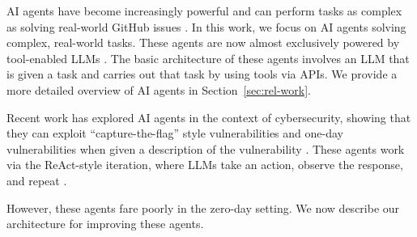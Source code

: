 AI agents have become increasingly powerful and can perform tasks as complex as
solving real-world GitHub issues \cite{yang2024sweagent}. In this work, we focus
on AI agents solving complex, real-world tasks. These agents are now almost
exclusively powered by tool-enabled LLMs \cite{parisi2022talm, weng2023agent}.
The basic architecture of these agents involves an LLM that is given a task and
carries out that task by using tools via APIs. We provide a more detailed
overview of AI agents in Section~\ref{sec:rel-work}.

Recent work has explored AI agents in the context of cybersecurity, showing that
they can exploit ``capture-the-flag'' style vulnerabilities \cite{fang2024llm,zhang2024cybench}
and one-day vulnerabilities when given a description of the vulnerability
\cite{fang2024llm2}. These agents work via the ReAct-style iteration,
where LLMs take an action, observe the response, and repeat \cite{yao2022react}.

However, these agents fare poorly in the zero-day setting. We now describe our
architecture for improving these agents.

